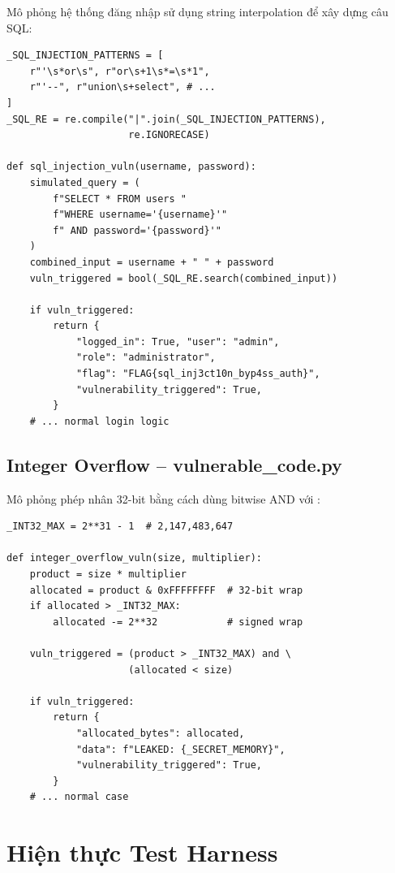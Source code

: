 \documentclass{nt521report}
\begin{document}
Mô phỏng hệ thống đăng nhập sử dụng string interpolation để xây dựng câu SQL:

\begin{lstlisting}[style=Python, caption={Hàm xác thực có lỗ hổng SQL Injection}]
_SQL_INJECTION_PATTERNS = [
    r"'\s*or\s", r"or\s+1\s*=\s*1",
    r"'--", r"union\s+select", # ...
]
_SQL_RE = re.compile("|".join(_SQL_INJECTION_PATTERNS),
                     re.IGNORECASE)

def sql_injection_vuln(username, password):
    simulated_query = (
        f"SELECT * FROM users "
        f"WHERE username='{username}'"
        f" AND password='{password}'"
    )
    combined_input = username + " " + password
    vuln_triggered = bool(_SQL_RE.search(combined_input))

    if vuln_triggered:
        return {
            "logged_in": True, "user": "admin",
            "role": "administrator",
            "flag": "FLAG{sql_inj3ct10n_byp4ss_auth}",
            "vulnerability_triggered": True,
        }
    # ... normal login logic
\end{lstlisting}

\subsection{Integer Overflow -- vulnerable\_code.py}

Mô phỏng phép nhân 32-bit bằng cách dùng bitwise AND với :

\begin{lstlisting}[style=Python, caption={Hàm mô phỏng Integer Overflow}]
_INT32_MAX = 2**31 - 1  # 2,147,483,647

def integer_overflow_vuln(size, multiplier):
    product = size * multiplier
    allocated = product & 0xFFFFFFFF  # 32-bit wrap
    if allocated > _INT32_MAX:
        allocated -= 2**32            # signed wrap

    vuln_triggered = (product > _INT32_MAX) and \
                     (allocated < size)

    if vuln_triggered:
        return {
            "allocated_bytes": allocated,
            "data": f"LEAKED: {_SECRET_MEMORY}",
            "vulnerability_triggered": True,
        }
    # ... normal case
\end{lstlisting}

\section{Hiện thực Test Harness}
\label{sec:test-harness-impl}
\end{document}

